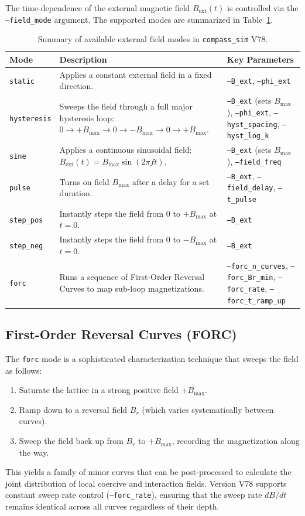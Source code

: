 \documentclass[11pt,a4paper]{article}
\newcommand{\code}[1]{\texttt{#1}}
\begin{document}
The time-dependence of the external magnetic field $B_{\text{ext}}(t)$ is controlled via the \code{--field\_mode} argument. The supported modes are summarized in Table~\ref{tab:field_modes}.

\begin{table}[htbp]
\centering
\caption{Summary of available external field modes in \code{compass\_sim} V78.}
\label{tab:field_modes}
\vspace{1ex}
\begin{tabular}{lp{8.5cm}p{4.5cm}}
\toprule
\textbf{Mode} & \textbf{Description} & \textbf{Key Parameters} \\
\midrule
\code{static} & Applies a constant external field in a fixed direction. & \code{--B\_ext}, \code{--phi\_ext} \\
\code{hysteresis} & Sweeps the field through a full major hysteresis loop: $0 \to +B_{\max} \to 0 \to -B_{\max} \to 0 \to +B_{\max}$. & \code{--B\_ext} (sets $B_{\max}$), \code{--phi\_ext}, \code{--hyst\_spacing}, \code{--hyst\_log\_k} \\
\code{sine} & Applies a continuous sinusoidal field: $B_{\text{ext}}(t) = B_{\max}\sin(2\pi f t)$. & \code{--B\_ext} (sets $B_{\max}$), \code{--field\_freq} \\
\code{pulse} & Turns on field $B_{\max}$ after a delay for a set duration. & \code{--B\_ext}, \code{--field\_delay}, \code{--t\_pulse} \\
\code{step\_pos} & Instantly steps the field from $0$ to $+B_{\max}$ at $t = 0$. & \code{--B\_ext} \\
\code{step\_neg} & Instantly steps the field from $0$ to $-B_{\max}$ at $t = 0$. & \code{--B\_ext} \\
\code{forc} & Runs a sequence of First-Order Reversal Curves to map sub-loop magnetizations. & \code{--forc\_n\_curves}, \code{--forc\_Br\_min}, \code{--forc\_rate}, \code{--forc\_t\_ramp\_up} \\
\bottomrule
\end{tabular}
\end{table}

\subsection{First-Order Reversal Curves (FORC)}
The \code{forc} mode is a sophisticated characterization technique that sweeps the field as follows:
\begin{enumerate}
    \item Saturate the lattice in a strong positive field $+B_{\max}$.
    \item Ramp down to a reversal field $B_r$ (which varies systematically between curves).
    \item Sweep the field back up from $B_r$ to $+B_{\max}$, recording the magnetization along the way.
\end{enumerate}
This yields a family of minor curves that can be post-processed to calculate the joint distribution of local coercive and interaction fields. Version V78 supports constant sweep rate control (\code{--forc\_rate}), ensuring that the sweep rate $dB/dt$ remains identical across all curves regardless of their depth.
\end{document}
